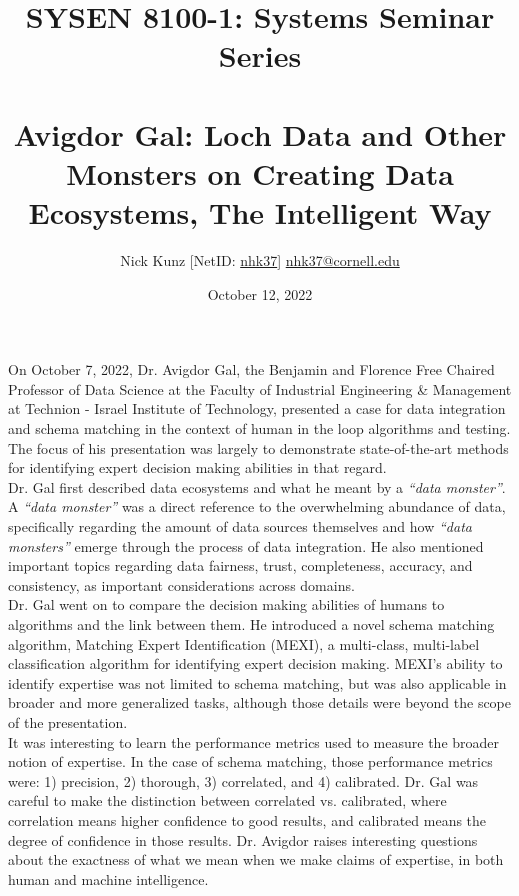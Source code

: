 \documentclass[11pt]{article}
\begin{document}
\title{SYSEN 8100-1: Systems Seminar Series\\~\\
    \Large Avigdor Gal: Loch Data and Other Monsters on Creating Data Ecosystems, The Intelligent Way
}
\author{
    Nick Kunz [NetID: \url{nhk37}] \hyperlink{nhk37@cornell.edu}{nhk37@cornell.edu}
}
\date{October 12, 2022}
\maketitle

On October 7, 2022, Dr. Avigdor Gal, the Benjamin and Florence Free Chaired Professor of Data Science at the Faculty of Industrial Engineering \& Management at Technion - Israel Institute of Technology, presented a case for data integration and schema matching in the context of human in the loop algorithms and testing. The focus of his presentation was largely to demonstrate state-of-the-art methods for identifying expert decision making abilities in that regard. \\

Dr. Gal first described data ecosystems and what he meant by a \textit{``data monster''}. A \textit{``data monster''} was a direct reference to the overwhelming abundance of data, specifically regarding the amount of data sources themselves and how \textit{``data monsters''} emerge through the process of data integration. He also mentioned important topics regarding data fairness, trust, completeness, accuracy, and consistency, as important considerations across domains.\\

Dr. Gal went on to compare the decision making abilities of humans to algorithms and the link between them. He introduced a novel schema matching algorithm, Matching Expert Identification (MEXI), a multi-class, multi-label classification algorithm for identifying expert decision making. MEXI's ability to identify expertise was not limited to schema matching, but was also applicable in broader and more generalized tasks, although those details were beyond the scope of the presentation. \\

It was interesting to learn the performance metrics used to measure the broader notion of expertise. In the case of schema matching, those performance metrics were: 1) precision, 2) thorough, 3) correlated, and 4) calibrated. Dr. Gal was careful to make the distinction between correlated vs. calibrated, where correlation means higher confidence to good results, and calibrated means the degree of confidence in those results. Dr. Avigdor raises interesting questions about the exactness of what we mean when we make claims of expertise, in both human and machine intelligence.
\end{document}
